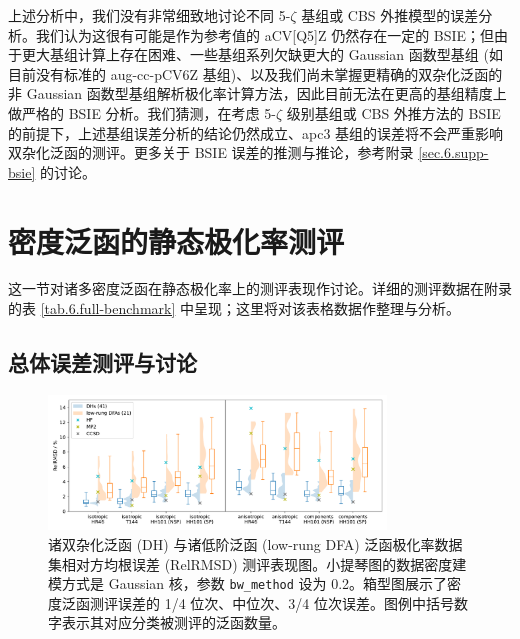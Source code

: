 上述分析中，我们没有非常细致地讨论不同 5-$\zeta$ 基组或 CBS 外推模型的误差分析。我们认为这很有可能是作为参考值的 aCV[Q5]Z 仍然存在一定的 BSIE；但由于更大基组计算上存在困难、一些基组系列欠缺更大的 Gaussian 函数型基组 (如目前没有标准的 aug-cc-pCV6Z 基组)、以及我们尚未掌握更精确的双杂化泛函的非 Gaussian 函数型基组解析极化率计算方法\cite{Brakestad-Frediani.JCTC.2020}，因此目前无法在更高的基组精度上做严格的 BSIE 分析。我们猜测，在考虑 5-$\zeta$ 级别基组或 CBS 外推方法的 BSIE 的前提下，上述基组误差分析的结论仍然成立、apc3 基组的误差将不会严重影响双杂化泛函的测评。更多关于 BSIE 误差的推测与推论，参考附录 \ref{sec.6.supp-bsie} 的讨论。

\section{密度泛函的静态极化率测评}
\label{sec.6.benchmark}

这一节对诸多密度泛函在静态极化率上的测评表现作讨论。详细的测评数据在附录的表 \ref{tab.6.full-benchmark} 中呈现；这里将对该表格数据作整理与分析。

\subsection{总体误差测评与讨论}

\begin{figure}[!hp]
    \centering
    \includegraphics[width=0.8\textwidth]{assets/benchmark-compare-dh-low.pdf}
    \caption[诸泛函极化率 RelRMSD 测评表现图]{诸双杂化泛函 (DH) 与诸低阶泛函 (low-rung DFA) 泛函极化率数据集相对方均根误差 (RelRMSD) 测评表现图。小提琴图的数据密度建模方式是 Gaussian 核，参数 \texttt{bw\_method} 设为 0.2。箱型图展示了密度泛函测评误差的 1/4 位次、中位次、3/4 位次误差。图例中括号数字表示其对应分类被测评的泛函数量。}
    \label{fig.6.benchmark-compare-dh-low}
\end{figure}

